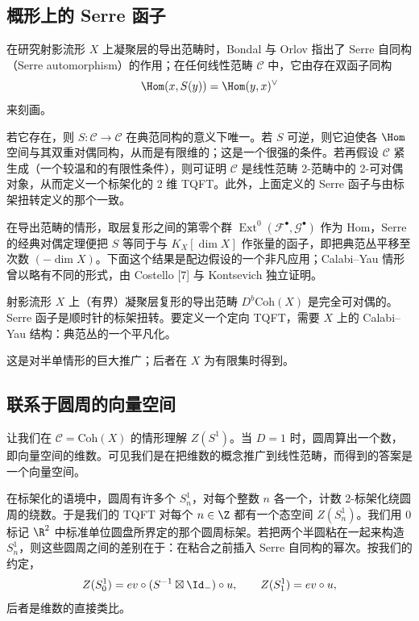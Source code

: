 \subsection{概形上的 Serre 函子}

在研究射影流形 $X$ 上凝聚层的导出范畴时，Bondal 与 Orlov 指出了 Serre 自同构（Serre automorphism）的作用；在任何线性范畴 $\mathcal{C}$ 中，它由存在双函子同构
\[
\Hom(x,S(y))=\Hom(y,x)^{\vee}
\]
来刻画。

若它存在，则 $S\colon\mathcal{C}\to\mathcal{C}$ 在典范同构的意义下唯一。若 $S$ 可逆，则它迫使各 $\Hom$ 空间与其双重对偶同构，从而是有限维的；这是一个很强的条件。若再假设 $\mathcal{C}$ 紧生成（一个较温和的有限性条件），则可证明 $\mathcal{C}$ 是线性范畴 2-范畴中的 2-可对偶对象，从而定义一个标架化的 2 维 TQFT。此外，上面定义的 Serre 函子与由标架扭转定义的那个一致。

在导出范畴的情形，取层复形之间的第零个群 $\operatorname{Ext}^{0}(\mathcal{F}^{\bullet},\mathcal{G}^{\bullet})$ 作为 Hom，Serre 的经典对偶定理便把 $S$ 等同于与 $K_X[\dim X]$ 作张量的函子，即把典范丛平移至次数 $(-\dim X)$。下面这个结果是配边假设的一个非凡应用；Calabi--Yau 情形曾以略有不同的形式，由 Costello [7] 与 Kontsevich 独立证明。

\begin{theorem}
射影流形 $X$ 上（有界）凝聚层复形的导出范畴 $D^{b}\mathrm{Coh}(X)$ 是完全可对偶的。Serre 函子是顺时针的标架扭转。要定义一个定向 TQFT，需要 $X$ 上的 Calabi--Yau 结构：典范丛的一个平凡化。
\end{theorem}

这是对半单情形的巨大推广；后者在 $X$ 为有限集时得到。

\subsection{联系于圆周的向量空间}

让我们在 $\mathcal{C}=\mathrm{Coh}(X)$ 的情形理解 $Z(S^1)$。当 $D=1$ 时，圆周算出一个数，即向量空间的维数。可见我们是在把维数的概念推广到线性范畴，而得到的答案是一个向量空间。

在标架化的语境中，圆周有许多个 $S^1_n$，对每个整数 $n$ 各一个，计数 2-标架化绕圆周的绕数。于是我们的 TQFT 对每个 $n\in\Z$ 都有一个态空间 $Z(S^1_n)$。我们用 $0$ 标记 $\R^{2}$ 中标准单位圆盘所界定的那个圆周标架。若把两个半圆粘在一起来构造 $S^1_n$，则这些圆周之间的差别在于：在粘合之前插入 Serre 自同构的幂次。按我们的约定，
\[
Z(S^1_0)=ev\circ(S^{-1}\boxtimes\Id_{-})\circ u,
\qquad
Z(S^1_1)=ev\circ u,
\]
后者是维数的直接类比。

